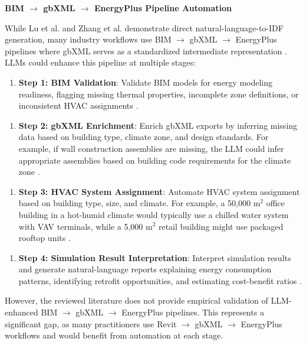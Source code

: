 \documentclass[12pt,a4paper]{article}
\begin{document}
\textbf{BIM $\rightarrow$ gbXML $\rightarrow$ EnergyPlus Pipeline Automation}

While Lu et al. and Zhang et al. demonstrate direct natural-language-to-IDF generation, many industry workflows use BIM $\rightarrow$ gbXML $\rightarrow$ EnergyPlus pipelines where gbXML serves as a standardized intermediate representation \cite{ref67}. LLMs could enhance this pipeline at multiple stages:

\begin{enumerate}
  \item \textbf{Step 1: BIM Validation}: Validate BIM models for energy modeling readiness, flagging missing thermal properties, incomplete zone definitions, or inconsistent HVAC assignments \cite{ref68}.
\end{enumerate}

\begin{enumerate}
  \item \textbf{Step 2: gbXML Enrichment}: Enrich gbXML exports by inferring missing data based on building type, climate zone, and design standards. For example, if wall construction assemblies are missing, the LLM could infer appropriate assemblies based on building code requirements for the climate zone \cite{ref69}.
\end{enumerate}

\begin{enumerate}
  \item \textbf{Step 3: HVAC System Assignment}: Automate HVAC system assignment based on building type, size, and climate. For example, a 50,000 m$^2$ office building in a hot-humid climate would typically use a chilled water system with VAV terminals, while a 5,000 m$^2$ retail building might use packaged rooftop units \cite{ref70}.
\end{enumerate}

\begin{enumerate}
  \item \textbf{Step 4: Simulation Result Interpretation}: Interpret simulation results and generate natural-language reports explaining energy consumption patterns, identifying retrofit opportunities, and estimating cost-benefit ratios \cite{ref71}.
\end{enumerate}

However, the reviewed literature does not provide empirical validation of LLM-enhanced BIM $\rightarrow$ gbXML $\rightarrow$ EnergyPlus pipelines. This represents a significant gap, as many practitioners use Revit $\rightarrow$ gbXML $\rightarrow$ EnergyPlus workflows and would benefit from automation at each stage.
\end{document}
